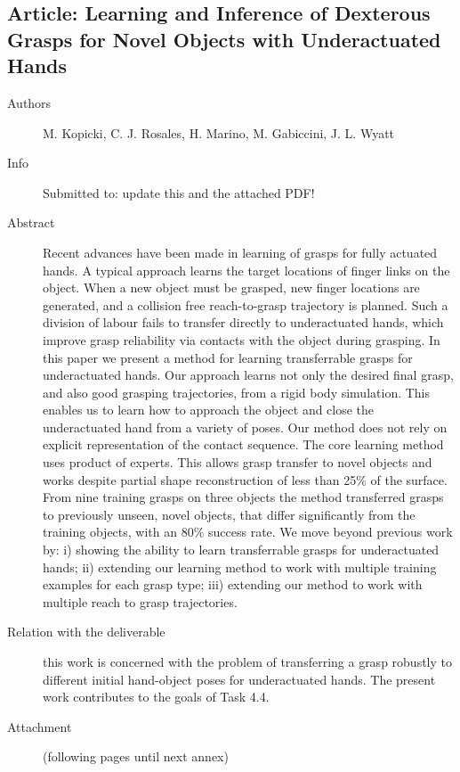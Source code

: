 \documentclass[a4paper,11pt,pdf]{pacmanreport}
\begin{document}
\subsection{Article: Learning and Inference of Dexterous Grasps for Novel Objects with Underactuated Hands}
\label{ann:LearningInferenceUnderactuatedHands}
\begin{description}
    \item[Authors] M. Kopicki, C. J. Rosales, H. Marino, M. Gabiccini, J. L. Wyatt
    \item[Info] Submitted to: {\color{red} update this and the attached PDF!}
    \item[Abstract] Recent advances have been made in learning of grasps for fully actuated hands. A typical approach learns the target locations of finger links on the object. When a new object must be grasped, new finger locations are generated, and a collision free reach-to-grasp trajectory is planned. Such a division of labour fails to transfer directly to underactuated hands, which improve grasp reliability via contacts with the object during grasping. In this paper we present a method for learning transferrable grasps for underactuated hands. Our approach learns not only the desired final grasp, and also good grasping trajectories, from a rigid body simulation. This enables us to learn how to approach the object and close the underactuated hand from a variety of poses. Our method does not rely on explicit representation of the contact sequence.
The core learning method uses product of experts. This allows grasp transfer to novel objects and works despite partial shape reconstruction of less than 25\% of the surface. From nine training grasps on three objects the method transferred grasps to previously unseen, novel objects, that differ significantly from the training objects, with an 80\% success rate. We move beyond previous work by: i) showing the ability to learn transferrable grasps for underactuated hands; ii) extending our learning
method to work with multiple training examples for each grasp
type; iii) extending our method to work with multiple reach to
grasp trajectories.
    \item[Relation with the deliverable] this work is concerned with the problem of transferring a grasp robustly to different initial hand-object poses for underactuated hands. The present work contributes to the goals of Task 4.4.
    \item[Attachment] (following pages until next annex)
\end{description}

\end{document}
